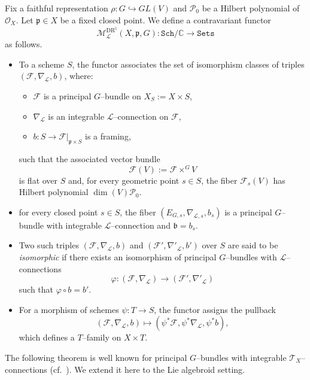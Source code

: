 \documentclass[12pt,reqno]{amsart}
\numberwithin{equation}{subsection}
\theoremstyle{definition}
\theoremstyle{theorem}
\begin{document}
Fix a faithful representation $\rho \colon G \hookrightarrow GL(V)$ and  $\mathcal{P}_{0}$ be a Hilbert polynomial of $\mathcal{O}_{X}$.
Let $\mathfrak{p} \in X$ be a fixed closed point.
We define a contravariant functor
\[
\mathcal{M}^{\text{DR}^{\natural}}_{\mathcal{L}}(X,\mathfrak{p},G)
\colon \texttt{Sch}/\mathbb{C} \longrightarrow \texttt{Sets}
\]
as follows.

\begin{itemize}
	\item
	To a scheme $S$, the functor associates the set of isomorphism classes of
	triples $(\mathcal{F},\nabla_{\mathcal{L}},b)$, where:
	\begin{itemize}
		\item
		$\mathcal{F}$ is a principal $G$--bundle on $X_S := X \times S$,
		\item
		$\nabla_{\mathcal{L}}$ is an integrable $\mathcal{L}$--connection on
		$\mathcal{F}$,
		\item
		$b \colon S \to \mathcal{F}|_{\mathfrak{p}\times S}$ is a framing,
	\end{itemize}
	such that the associated vector bundle
	\[
	\mathcal{F}(V) := \mathcal{F} \times^{G} V
	\]
	is flat over $S$ and, for every geometric point $s \in S$,
	the fiber $\mathcal{F}_s(V)$ has Hilbert polynomial $\dim(V)\mathcal{P}_{0}$.
	
	\item for every closed point $s\in S$, the fiber $(E_{G,s}, \nabla_{\mathcal{L},s},b_{s})$ is a principal $G$--bundle with integrable $\mathcal{L}$--connection and $\mathfrak{b}=b_{s}$.
	
	\item
	Two such triples $(\mathcal{F},\nabla_{\mathcal{L}},b)$ and
	$(\mathcal{F}',\nabla'_{\mathcal{L}},b')$ over $S$ are said to be
	\emph{isomorphic} if there exists an isomorphism of principal $G$--bundles
	with $\mathcal{L}$--connections
	\[
	\varphi \colon (\mathcal{F},\nabla_{\mathcal{L}})
	\longrightarrow
	(\mathcal{F}',\nabla'_{\mathcal{L}})
	\]
	such that $\varphi \circ b = b'$.
	
	\item
	For a morphism of schemes $\psi \colon T \to S$, the functor assigns the pullback
	\[
	(\mathcal{F},\nabla_{\mathcal{L}},b)
	\longmapsto
	(\psi^{*}\mathcal{F}, \psi^{*}\nabla_{\mathcal{L}}, \psi^{*}b),
	\]
	which defines a $T$--family on $X \times T$.
\end{itemize}




The following theorem is well known for principal $G$--bundles with integrable $\mathcal{T}_{X}$--connections (cf.~\cite[\S\,9, Th.~9.10]{CT.Simpson-1995}). We extend it here to the
Lie algebroid setting.
\end{document}
